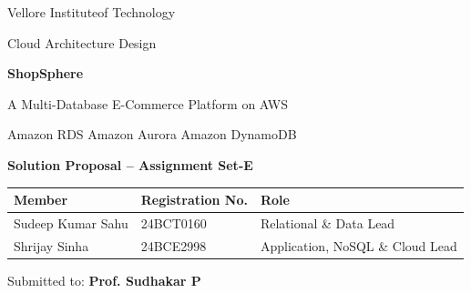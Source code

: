\documentclass[11pt,a4paper]{article}
\newcommand{\memberA}{Sudeep Kumar Sahu}
\newcommand{\rollA}{24BCT0160}
\newcommand{\memberB}{Shrijay Sinha}
\newcommand{\rollB}{24BCE2998}
\newcommand{\course}{Cloud Architecture Design}
\newcommand{\faculty}{Prof. Sudhakar P}
\newcommand{\institute}{Vellore Instituteof Technology}
\begin{document}
\begin{titlepage}
\centering
\vspace*{1.5cm}
{\color{muted}\large \institute\par}
\vspace{0.4cm}
{\color{muted}\course\par}
\vspace{2cm}
{\Huge\bfseries\color{primary} ShopSphere\par}
\vspace{0.3cm}
{\Large A Multi-Database E-Commerce Platform on AWS\par}
\vspace{0.3cm}
{\large\color{muted} Amazon RDS \textbullet{} Amazon Aurora \textbullet{} Amazon DynamoDB\par}
\vspace{1.2cm}
{\large\bfseries Solution Proposal -- Assignment Set-E\par}
\vspace{2cm}
\begin{tabular}{@{}lll@{}}
\toprule
\textbf{Member} & \textbf{Registration No.} & \textbf{Role}\\
\midrule
\memberA & \rollA & Relational \& Data Lead\\
\memberB & \rollB & Application, NoSQL \& Cloud Lead\\
\bottomrule
\end{tabular}

\vfill
Submitted to: \textbf{\faculty}\\[4pt]
\end{titlepage}

\begin{abstract}
\noindent We propose \textbf{ShopSphere}, a working online shop deployed on Amazon Web Services in which customers register and log in, browse products, manage a cart, place orders, pay and track deliveries. Rather than forcing all data into one database, ShopSphere places each kind of data in the AWS database whose model matches its access pattern: \textbf{Amazon RDS for PostgreSQL} stores customers, products, orders and payments with full ACID guarantees; \textbf{Amazon Aurora PostgreSQL} hosts the same relational schema during a simulated festival sale, separating write traffic (orders) from read traffic (browsing) across instances in different Availability Zones; and \textbf{Amazon DynamoDB} keeps shopping carts, login sessions and user preferences as key-value documents. A runtime switch moves the application from RDS to Aurora without redeployment, and every screen displays which database and which instance served it, so each architectural claim can be verified live in the AWS Management Console. The design targets near-zero cost (a few dollars of AWS Free Tier credits) and is planned for a two-member team with clearly separated ownership.
\end{abstract}
\end{document}
